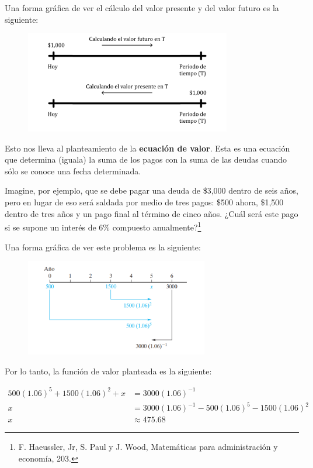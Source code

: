 \documentclass{article}
\begin{document}
                Una forma gráfica de ver el cálculo del valor presente y del valor futuro es la siguiente:

                \begin{figure}[h]
                    \centering
                    \includegraphics[width=9cm]{img_1.png}
                \end{figure}

                Esto nos lleva al planteamiento de la \textbf{ecuación de valor}. Esta es una ecuación que determina (iguala) la suma de los pagos con la suma de las deudas cuando sólo se conoce una fecha determinada.

                Imagine, por ejemplo, que se debe pagar una deuda de \$3,000 dentro de seis años, pero en lugar de eso será saldada por medio de tres pagos: \$500 ahora, \$1,500 dentro de tres años y un pago final al término de cinco años. ¿Cuál será este pago si se supone un interés de 6\% compuesto anualmente?\footnote[4]{F. Haeussler, Jr, S. Paul y J. Wood, Matemáticas para administración y economía, 203.}

                Una forma gráfica de ver este problema es la siguiente:

                \begin{figure}[h]
                    \centering
                    \includegraphics[width=8cm]{img_2.png}
                \end{figure}

                Por lo tanto, la función de valor planteada es la siguiente:

                \begin{equation*}
                    \begin{split}
                        500(1.06)^{5} + 1500(1.06)^{2} + x &= 3000(1.06)^{-1} \\
                        x &= 3000(1.06)^{-1} - 500(1.06)^{5} - 1500(1.06)^{2} \\
                        x &\approx 475.68
                    \end{split}
                \end{equation*}
\end{document}
